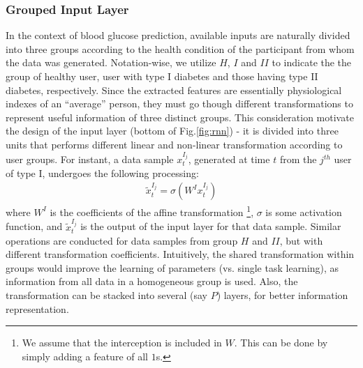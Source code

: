 \subsubsection{Grouped Input Layer}
In the context of blood glucose prediction, available inputs are naturally divided into three groups according to the health condition of the participant from whom the data was generated. Notation-wise, we utilize $H$, $I$ and $II$ to indicate the the group of healthy user, user with type I diabetes and those having type II diabetes, respectively. Since the extracted features are essentially physiological indexes of an ``average'' person, they must go though different transformations to represent useful information of three distinct groups. This consideration motivate the design of the input layer (bottom of Fig.\ref{fig:rnn}) - it is divided into three units that performs different linear and non-linear transformation according to user groups. For instant, a data sample $x_t^{I_j}$, generated at time $t$ from the $j^{th}$ user of type I, undergoes the following processing:
\begin{align}
\tilde{x}_t^{I_j} = \sigma \left( W^Ix_t^{I_j} \right)
\end{align}     
where $W^I$ is the coefficients of the affine transformation \footnote{We assume that the interception is included in $W$. This can be done by simply adding a feature of all $1$s.}, $\sigma$ is some activation function, and $\tilde{x}_t^{I_j}$ is the output of the input layer for that data sample. Similar operations are conducted for data samples from group $H$ and $II$, but with different transformation coefficients. Intuitively, the shared transformation within groups would improve the learning of parameters (vs. single task learning), as information from all data in a homogeneous group is used. Also, the transformation can be stacked into several (say $P$) layers, for better information representation.   


